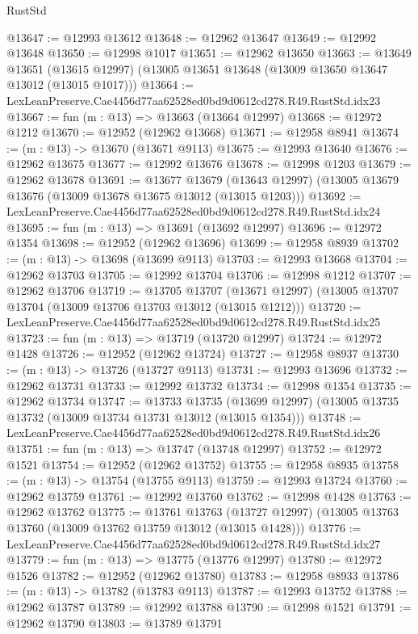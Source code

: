 \begin{lexlean}{RustStd}
\begin{coremodule}
@13647 := @12993 @13612
@13648 := @12962 @13647
@13649 := @12992 @13648
@13650 := @12998 @1017
@13651 := @12962 @13650
@13663 := @13649
    @13651
    (@13615 @12997)
    (@13005 @13651 @13648 (@13009 @13650 @13647 @13012 (@13015 @1017)))
@13664 := LexLeanPreserve.Cae4456d77aa62528ed0bd9d0612cd278.R49.RustStd.idx23
@13667 := fun (m : @13) => @13663 (@13664 @12997)
@13668 := @12972 @1212
@13670 := @12952 (@12962 @13668)
@13671 := @12958 @8941
@13674 := (m : @13) -> @13670 (@13671 @9113)
@13675 := @12993 @13640
@13676 := @12962 @13675
@13677 := @12992 @13676
@13678 := @12998 @1203
@13679 := @12962 @13678
@13691 := @13677
    @13679
    (@13643 @12997)
    (@13005 @13679 @13676 (@13009 @13678 @13675 @13012 (@13015 @1203)))
@13692 := LexLeanPreserve.Cae4456d77aa62528ed0bd9d0612cd278.R49.RustStd.idx24
@13695 := fun (m : @13) => @13691 (@13692 @12997)
@13696 := @12972 @1354
@13698 := @12952 (@12962 @13696)
@13699 := @12958 @8939
@13702 := (m : @13) -> @13698 (@13699 @9113)
@13703 := @12993 @13668
@13704 := @12962 @13703
@13705 := @12992 @13704
@13706 := @12998 @1212
@13707 := @12962 @13706
@13719 := @13705
    @13707
    (@13671 @12997)
    (@13005 @13707 @13704 (@13009 @13706 @13703 @13012 (@13015 @1212)))
@13720 := LexLeanPreserve.Cae4456d77aa62528ed0bd9d0612cd278.R49.RustStd.idx25
@13723 := fun (m : @13) => @13719 (@13720 @12997)
@13724 := @12972 @1428
@13726 := @12952 (@12962 @13724)
@13727 := @12958 @8937
@13730 := (m : @13) -> @13726 (@13727 @9113)
@13731 := @12993 @13696
@13732 := @12962 @13731
@13733 := @12992 @13732
@13734 := @12998 @1354
@13735 := @12962 @13734
@13747 := @13733
    @13735
    (@13699 @12997)
    (@13005 @13735 @13732 (@13009 @13734 @13731 @13012 (@13015 @1354)))
@13748 := LexLeanPreserve.Cae4456d77aa62528ed0bd9d0612cd278.R49.RustStd.idx26
@13751 := fun (m : @13) => @13747 (@13748 @12997)
@13752 := @12972 @1521
@13754 := @12952 (@12962 @13752)
@13755 := @12958 @8935
@13758 := (m : @13) -> @13754 (@13755 @9113)
@13759 := @12993 @13724
@13760 := @12962 @13759
@13761 := @12992 @13760
@13762 := @12998 @1428
@13763 := @12962 @13762
@13775 := @13761
    @13763
    (@13727 @12997)
    (@13005 @13763 @13760 (@13009 @13762 @13759 @13012 (@13015 @1428)))
@13776 := LexLeanPreserve.Cae4456d77aa62528ed0bd9d0612cd278.R49.RustStd.idx27
@13779 := fun (m : @13) => @13775 (@13776 @12997)
@13780 := @12972 @1526
@13782 := @12952 (@12962 @13780)
@13783 := @12958 @8933
@13786 := (m : @13) -> @13782 (@13783 @9113)
@13787 := @12993 @13752
@13788 := @12962 @13787
@13789 := @12992 @13788
@13790 := @12998 @1521
@13791 := @12962 @13790
@13803 := @13789
    @13791

\end{coremodule}
\end{lexlean}
